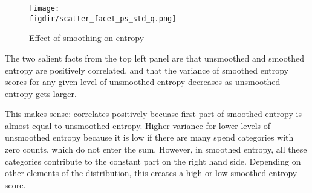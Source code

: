 \begin{figure}[H]
    \centering 
    \caption{Effect of smoothing on entropy}
    \label{fig:scatter_facets}
    \texttt{[image: \\figdir/scatter\_facet\_ps\_std\_q.png]}
\end{figure}






The two salient facts from the top left panel are that unsmoothed and smoothed
entropy are positively correlated, and that the variance of smoothed entropy
scores for any given level of unsmoothed entropy decreases as unsmoothed
entropy gets larger.

This makes sense: correlates positively becuase first part of smoothed entropy
is almost equal to unsmoothed entropy. Higher variance for lower levels of
unsmoothed entropy because it is low if there are many spend categories with zero
counts, which do not enter the sum. However, in smoothed entropy, all these
categories contribute to the constant part on the right hand side. Depending on
other elements of the distribution, this creates a high or low smoothed entropy
score.


